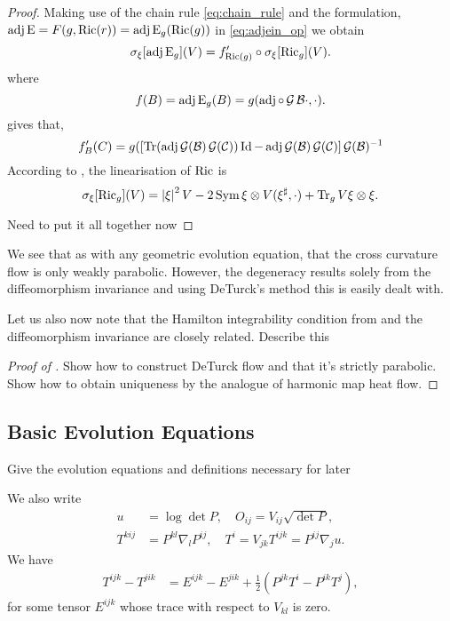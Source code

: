 \documentclass[a4paper, 12pt]{amsart}
\begin{document}
\begin{proof}
Making use of the chain rule \eqref{eq:chain_rule} and the formulation, \(\operatorname{adj}\operatorname{E} = F(g, \operatorname{Ric}(r)) = \operatorname{adj}\operatorname{E}_g(\operatorname{Ric}(g))\) in \eqref{eq:adjein_op} we obtain
\[
\sigma_{\xi} [\operatorname{adj}\operatorname{E}_g] (V) = f'_{\operatorname{Ric}(g)} \circ \sigma_{\xi} [\operatorname{Ric}_g] (V).
\]
where
\[
f(B) = \operatorname{adj}\operatorname{E}_g (B) = g(\operatorname{adj} \circ \operatorname{\mathcal{G}} \mathcal{B} \cdot, \cdot).
\]
 gives that,
\[
f'_B (C) = g(\left[\operatorname{Tr}(\operatorname{adj}\operatorname{\mathcal{G}}(\mathcal{B}) \operatorname{\mathcal{G}}(\mathcal{C}))\operatorname{Id} - \operatorname{adj}\operatorname{\mathcal{G}}(\mathcal{B}) \operatorname{\mathcal{G}}(\mathcal{C})\right] \operatorname{\mathcal{G}}(\mathcal{B})^{-1}
\]
According to \cite[Section 5.1]{MR2265040}, the linearisation of \(\operatorname{Ric}\) is
\[
\sigma_{\xi} [\operatorname{Ric}_g] (V) = \left\lvert{\xi}\right\rvert^2 V - 2 \operatorname{Sym} \xi \otimes V(\xi^{\sharp}, \cdot) + \operatorname{Tr}_g V \xi \otimes \xi.
\]

{\color{red} Need to put it all together now}
\end{proof}

\begin{rem}
\label{rem:invariance_integrability}

We see that as with any geometric evolution equation, that the cross curvature flow is only weakly parabolic. However, the degeneracy results solely from the diffeomorphism invariance and using DeTurck's method this is easily dealt with.

Let us also now note that the Hamilton integrability condition from  and the diffeomorphism invariance are closely related. {\color{red} Describe this}
\end{rem}

\begin{proof}[Proof of ]

{\color{red} Show how to construct DeTurck flow and that it's strictly parabolic. Show how to obtain uniqueness by the analogue of harmonic map heat flow.}
\end{proof}

\subsection{Basic Evolution Equations}
\label{subsec:xcf_evolution}

{\color{red} Give the evolution equations and definitions necessary for later}

We also write
\begin{align}
 u&=\log\det P,\quad
O_{ij}=V_{ij}\sqrt{\det P},\\
T^{kij}&=P^{kl}\nabla_l P^{ij},\quad T^i=V_{jk}T^{ijk}=P^{ij}\nabla_ju.
\end{align}
We have
\begin{align}
    T^{ijk}-T^{jik}&=E^{ijk}-E^{jik}+\frac{1}{2}\left(P^{jk}T^i-P^{ik}T^j\right),
\end{align}
for some tensor $E^{ijk}$ whose trace with respect to $V_{kl}$ is zero.
\end{document}
